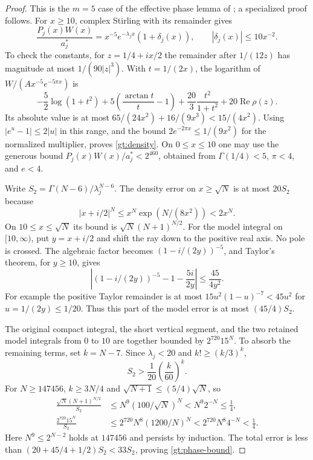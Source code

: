 \documentclass[11pt,a4paper]{article}
\theoremstyle{definition}
\theoremstyle{remark}
\numberwithin{equation}{section}
\begin{document}
\begin{proof}
This is the $m=5$ case of the effective phase lemma of
\cite{PolygammaResonances}; a specialized proof follows.
For $x\ge10$, complex Stirling with its remainder \cite[\S5.11(ii)]{DLMF}
gives
\begin{equation}\label{gt:density}
 \frac{P_j(x)W(x)}{a_j^*}
 =x^{-5}e^{-\lambda_jx}(1+\delta_j(x)),\qquad
                      |\delta_j(x)|\le10x^{-2}.
\end{equation}
To check the constants, for $z=1/4+ix/2$ the remainder after
$1/(12z)$ has magnitude at most $1/(90|z|^3)$. With $t=1/(2x)$,
the logarithm of $W/(Ax^{-5}e^{-5\pi x})$ is
\[
 -\frac52\log(1+t^2)
 +5\left(\frac{\arctan t}{t}-1\right)
 +\frac{20}{3}\frac{t^2}{1+t^2}+20\operatorname{Re}\rho(z).
\]
Its absolute value is at most
$65/(24x^2)+16/(9x^3)<15/(4x^2)$.
Using $|e^u-1|\le2|u|$ in this range, and the bound
$2e^{-2\pi x}\le1/(9x^2)$ for the normalized multiplier, proves
\eqref{gt:density}. On $0\le x\le10$ one may use the generous
bound $P_j(x)W(x)/a_j^*<2^{460}$, obtained from
$\Gamma(1/4)<5$, $\pi<4$, and $e<4$.

Write $S_2=\Gamma(N-6)/\lambda_j^{N-6}$.
The density error on $x\ge\sqrt N$ is at most $20S_2$ because
\[
 |x+i/2|^N\le x^N\exp(N/(8x^2))<2x^N.
\]
On $10\le x\le\sqrt N$ its bound is
$\sqrt N(N+1)^{N/2}$.
For the model integral on $[10,\infty)$, put $y=x+i/2$ and
shift the ray down to the positive real axis. No pole is crossed.
The algebraic factor becomes $(1-i/(2y))^{-5}$, and Taylor's
theorem, for $y\ge10$, gives
\[
 \left|(1-i/(2y))^{-5}-1-\frac{5i}{2y}\right|
                         \le\frac{45}{4y^2}.
\]
For example the positive Taylor remainder is at most
$15u^2(1-u)^{-7}<45u^2$ for $u=1/(2y)\le1/20$.
Thus this part of the model error is at most $(45/4)S_2$.

The original compact integral, the short vertical segment, and the
two retained model integrals from $0$ to $10$ are together bounded
by $2^{720}15^N$. To absorb the remaining terms, set $k=N-7$.
Since $\lambda_j<20$ and $k!\ge(k/3)^k$,
\[
 S_2>\frac1{20}\left(\frac{k}{60}\right)^k.
\]
For $N\ge147456$, $k\ge3N/4$ and
$\sqrt{N+1}\le(5/4)\sqrt N$, so
\begin{align*}
 \frac{\sqrt N(N+1)^{N/2}}{S_2}
     &\le N^9(100/\sqrt N)^N<N^9 2^{-N}\le\tfrac14,\\
 \frac{2^{720}15^N}{S_2}
     &\le2^{720}N^8(1200/N)^N
                  <2^{720}N^8 4^{-N}<\tfrac14.
\end{align*}
Here $N^9\le2^{N-2}$ holds at $147456$ and persists by induction.
The total error is less than
$(20+45/4+1/2)S_2<33S_2$, proving \eqref{gt:phase-bound}.
\end{proof}
\end{document}
